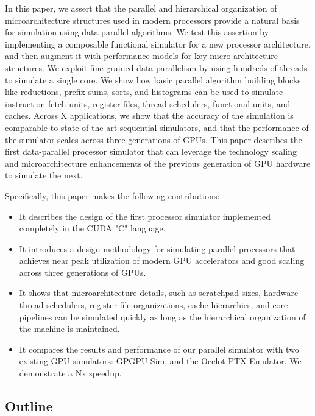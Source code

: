 \documentclass[conference, 10pt]{IEEEtran}
\begin{document}
In this paper, we assert that the parallel and hierarchical organization of
microarchitecture structures used in modern processors provide a natural
basis for simulation using data-parallel algorithms.  We test this assertion by
implementing a composable functional simulator for a new processor architecture,
and then augment it with performance models for key micro-architecture
structures.  We exploit fine-grained data parallelism by using hundreds of
threads to simulate a single core.  We show how basic parallel algorithm
building blocks like reductions, prefix sums, sorts, and histograms can be used
to simulate instruction fetch units, register files, thread schedulers,
functional units, and caches.  Across X applications, we show that the accuracy
of the simulation is comparable to state-of-the-art sequential simulators, and
that the performance of the simulator scales across three generations of GPUs.
This paper describes the first data-parallel processor simulator that can 
leverage the technology scaling and microarchitecture enhancements of the
previous generation of GPU hardware to simulate the next.

Specifically, this paper makes the following contributions:

\begin{itemize}
	\item It describes the design of the first processor simulator implemented
		completely in the CUDA "C" language.

	\item It introduces a design methodology for simulating parallel processors
		that achieves near peak utilization of modern GPU accelerators and
		good scaling across three generations of GPUs.
		
	\item It shows that microarchitecture details, such as scratchpad sizes,
		hardware thread schedulers, register file organizations, cache
		hierarchies, and core pipelines can be simulated quickly as long as
		the hierarchical organization of the machine is maintained.
	
	\item It compares the results and performance of our parallel simulator with
		two existing GPU simulators: GPGPU-Sim, and the Ocelot PTX Emulator.  
		We demonstrate a Nx speedup.
\end{itemize}

\subsection{Outline}
\end{document}
